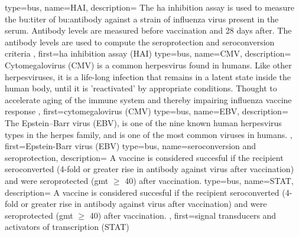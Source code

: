 {
    type=bus,
    name=HAI,
    description={
        The \acrlong{ha} inhibition assay is used to measure the \gls{bu:titer} of \gls{bu:antibody} against a strain of influenza virus present in the serum.
        Antibody levels are measured before vaccination and 28 days after.
        The antibody levels are used to compute the seroprotection and seroconversion criteria
    },
    first={\acrlong{ha} inhibition assay (HAI)}
}
{
    type=bus,
    name=CMV,
    description={
        Cytomegalovirus (CMV) is a common herpesvirus found in humans.
        Like other herpesviruses, it is a life-long infection that remains in a latent state inside the human body, until it is 'reactivated' by appropriate conditions.
        Thought to accelerate aging of the immune system and thereby impairing influenza vaccine response  \citep{van_den_Berg_2019}
    },
    first={cytomegalovirus (CMV)}
}
{
    type=bus,
    name=EBV,
    description={
        The Epstein–Barr virus (EBV), is one of the nine known human herpesvirus types in the herpes family, and is one of the most common viruses in humans.
    },
    first={Epstein-Barr virus (EBV)}
}
{
    type=bus,
    name=seroconversion and seroprotection,
    description={
        A vaccine is considered succesful if the recipient seroconverted (4-fold or greater rise in antibody against virus after vaccination) and were seroprotected (\acrshort{gmt} \(\ge\) 40) after vaccination.
    }
}
{
    type=bus,
    name=STAT,
    description={
        A vaccine is considered succesful if the recipient seroconverted (4-fold or greater rise in antibody against virus after vaccination) and were seroprotected (\acrshort{gmt} \(\ge\) 40) after vaccination.
    },
    first={signal transducers and activators of transcription (STAT)}
}


